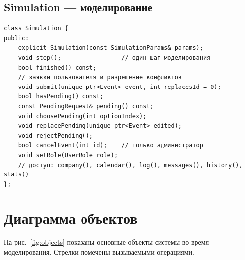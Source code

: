 \documentclass[12pt,a4paper]{article}
\begin{document}
\subsection*{Simulation --- моделирование}
\begin{Verbatim}
class Simulation {
public:
    explicit Simulation(const SimulationParams& params);
    void step();                 // один шаг моделирования
    bool finished() const;
    // заявки пользователя и разрешение конфликтов
    void submit(unique_ptr<Event> event, int replacesId = 0);
    bool hasPending() const;
    const PendingRequest& pending() const;
    void choosePending(int optionIndex);
    void replacePending(unique_ptr<Event> edited);
    void rejectPending();
    bool cancelEvent(int id);    // только администратор
    void setRole(UserRole role);
    // доступ: company(), calendar(), log(), messages(), history(), stats()
};
\end{Verbatim}

\section{Диаграмма объектов}

На рис.~\ref{fig:objects} показаны основные объекты системы во время
моделирования. Стрелки помечены вызываемыми операциями.
\end{document}
